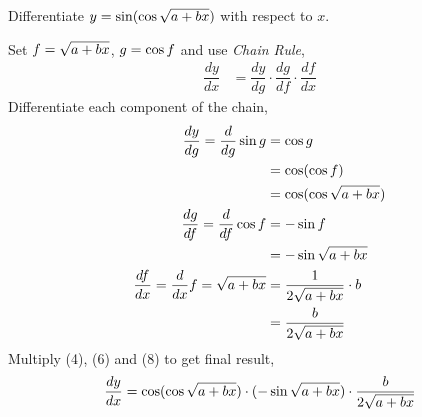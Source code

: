 

\question Differentiate $y=\sin(\cos\sqrt{a+bx})$ with respect to $x$.

\watchout

\begin{solution}
  Set $f=\sqrt{a+bx}$, $g=\cos f$ and use \textit{Chain Rule},
  \begin{align}
    \dfrac{dy}{dx} &= \dfrac{dy}{dg}\cdot\dfrac{dg}{df}\cdot\dfrac{df}{dx}
  \end{align}
  Differentiate each component of the chain,
  \begin{align}
    \dfrac{dy}{dg}=\dfrac{d}{dg} \sin g
                 &=\cos g \\
                 &=\cos(\cos f) \\
                 &=\cos(\cos \sqrt{a+bx}) \\
    \dfrac{dg}{df}=\dfrac{d}{df} \cos f
                 &=-\sin f \\
                 &=-\sin \sqrt{a+bx} \\
    \dfrac{df}{dx}=\dfrac{d}{dx}f=\sqrt{a+bx}
                 &=\dfrac{1}{2\sqrt{a+bx}}\cdot b \\
                 &=\dfrac{b}{2\sqrt{a+bx}}
  \end{align}
  Multiply (4), (6) and (8) to get final result,
  \begin{align}
    \dfrac{dy}{dx}=\cos(\cos \sqrt{a+bx})\cdot 
                   (-\sin \sqrt{a+bx})\cdot
                   \dfrac{b}{2\sqrt{a+bx}}
  \end{align}
\end{solution}

